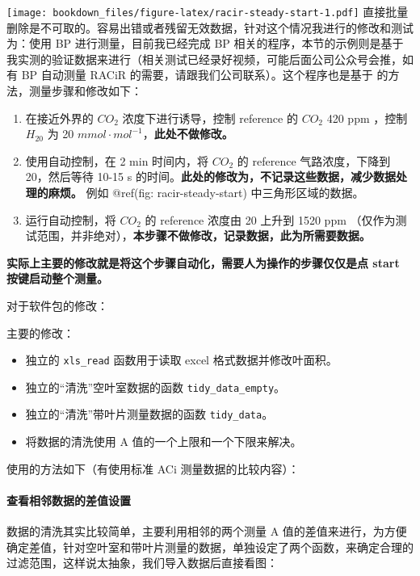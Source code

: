 \documentclass[
]{krantz}
\providecommand{\tightlist}{%
  \setlength{\itemsep}{0pt}\setlength{\parskip}{0pt}}
\begin{document}
\texttt{[image: bookdown\_files/figure-latex/racir-steady-start-1.pdf]}
直接批量删除是不可取的。容易出错或者残留无效数据，针对这个情况我进行的修改和测试为：使用 BP 进行测量，目前我已经完成 BP 相关的程序，本节的示例则是基于我实测的验证数据来进行（相关测试已经录好视频，可能后面公司公众号会推，如有 BP 自动测量 RACiR 的需要，请跟我们公司联系）。这个程序也是基于 \citet{Coursolle12019} 的方法，测量步骤和修改如下：

\begin{enumerate}
\def\labelenumi{\arabic{enumi}.}
\item
  在接近外界的 \(CO_2\) 浓度下进行诱导，控制 reference 的 \(CO_2\) 420 ppm ，控制 \(H_20\) 为 20 \(mmol \cdot mol^{-1}\)，\textbf{此处不做修改。}
\item
  使用自动控制，在 2 min 时间内，将 \(CO_2\) 的 reference 气路浓度，下降到 20，然后等待 10-15 s 的时间。\textbf{此处的修改为，不记录这些数据，减少数据处理的麻烦。} 例如 @ref(fig: racir-steady-start) 中三角形区域的数据。
\item
  运行自动控制，将 \(CO_2\) 的 reference 浓度由 20 上升到 1520 ppm （仅作为测试范围，并非绝对），\textbf{本步骤不做修改，记录数据，此为所需要数据。}
\end{enumerate}

\textbf{实际上主要的修改就是将这个步骤自动化，需要人为操作的步骤仅仅是点 start 按键启动整个测量。}

对于软件包的修改：

主要的修改：

\begin{itemize}
\tightlist
\item
  独立的 \texttt{xls\_read} 函数用于读取 excel 格式数据并修改叶面积。
\item
  独立的``清洗''空叶室数据的函数 \texttt{tidy\_data\_empty}。
\item
  独立的``清洗''带叶片测量数据的函数 \texttt{tidy\_data}。
\item
  将数据的清洗使用 A 值的一个上限和一个下限来解决。
\end{itemize}

使用的方法如下（有使用标准 ACi 测量数据的比较内容）：

\hypertarget{delta_max-check}{%
\paragraph{查看相邻数据的差值设置}\label{delta_max-check}}

数据的清洗其实比较简单，主要利用相邻的两个测量 A 值的差值来进行，为方便确定差值，针对空叶室和带叶片测量的数据，单独设定了两个函数，来确定合理的过滤范围，这样说太抽象，我们导入数据后直接看图：
\end{document}
